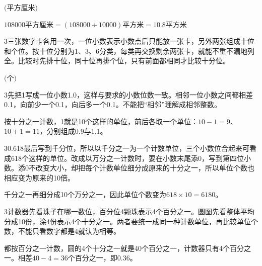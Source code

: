 \documentclass[multi=snippet,border={5bp 20bp 5bp 5bp}]{standalone}
\newenvironment{snippet}[3]{\begin{minipage}{#1bp}\color{answerred}\fontsize{#2}{#3}\selectfont\raggedright}{\end{minipage}}
\begin{document}
\begin{snippet}{80}{9.0}{14}\SourceSans\setlength{\mathindent}{2bp}\(\text{(平方厘米)}\)\end{snippet}
\begin{snippet}{505}{9.0}{14}\SourceSans\setlength{\mathindent}{2bp}\(108000\text{平方厘米}=(108000\div10000)\text{平方米}=10.8\text{平方米}\)\end{snippet}
\begin{snippet}{505}{11.5}{14}\begin{multicols}{3}\raggedcolumns 三张数字卡各用一次，一位小数表示小数点后只能放一张卡，另外两张组成十位和个位。按十位分别为1、3、6分类，每类再交换剩余两张卡，就能不重不漏地列全。比较时先排十位，同十位再排个位，只有前面都相同才比较十分位。\end{multicols}\end{snippet}
\begin{snippet}{80}{9.0}{14}\SourceSans\setlength{\mathindent}{2bp}\(\text{(个)}\)\end{snippet}
\begin{snippet}{505}{11.5}{14}\begin{multicols}{3}\raggedcolumns 先把1写成一位小数1.0，这样与要求的小数位数一致。相邻一位小数之间都相差0.1，向前少一个0.1，向后多一个0.1。不能把“相邻”理解成相邻整数。\par 按十分之一计数，1就是10个这样的单位，前后各取一个单位：\(10-1=9\)\allowbreak 、\(10+1=11\)\allowbreak ，分别组成0.9与1.1。\end{multicols}\end{snippet}
\begin{snippet}{505}{11.5}{14}\begin{multicols}{3}\raggedcolumns 0.618最后写到千分位，所以以千分之一为一个计数单位，三个小数位合起来可看成618个这样的单位。改成以万分之一计数时，要在小数末尾添0，写到第四位小数。添0不改变大小，却把每个计数单位细分成原来的十分之一，所以单位个数也相应变为原来的10倍。\par 千分之一再细分成10个万分之一，因此单位个数变为\(618\times10=6180\)\allowbreak 。\end{multicols}\end{snippet}
\begin{snippet}{505}{11.5}{14}\begin{multicols}{3}\raggedcolumns 计数器先看珠子在哪一数位，百分位4颗珠表示4个百分之一。圆图先看整体平均分成10份，涂4份表示4个十分之一。两者要统一成同一种计数单位，再比较单位个数，不能只看数字都是4就认为相等。\par 都按百分之一计数，圆的4个十分之一就是40个百分之一，计数器只有4个百分之一。相差\(40-4=36\)\allowbreak 个百分之一，即0.36。\end{multicols}\end{snippet}
\end{document}
